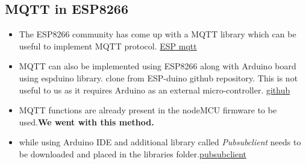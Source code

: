 \documentclass[16pt]{article}
\begin{document}
\vspace{0.5cm}

\subsection{MQTT in ESP8266}

\begin{itemize}

\item
  The ESP8266 community has come up with a MQTT library which can be
  useful to implement MQTT protocol. \href{https://github.com/tuanpmt/esp_mqtt}{ESP mqtt}
 
\item
  MQTT can also be implemented using ESP8266 along with Arduino board
  using espduino library. clone from ESP-duino github repository. This is not
  useful to us as it requires Arduino as an external micro-controller. \href{https://github.com/tuanpmt/espduino}{github}
\item
  MQTT functions are already present in the nodeMCU firmware to be used.\textbf{We went with this method.}
\item
  while using Arduino IDE and additional library called
  \emph{Pubsubclient} needs to be downloaded and placed in the libraries
  folder.\href{https://github.com/Imroy/pubsubclient}{pubsubclient}
\end{itemize}
\end{document}
